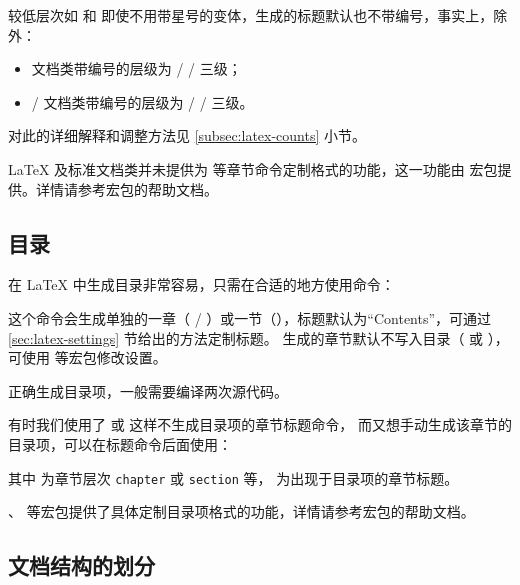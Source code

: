 较低层次如  和  即使不用带星号的变体，生成的标题默认也不带编号，事实上，除  外：
\begin{itemize}
  \item {} 文档类带编号的层级为  /  /  三级；
  \item {} /  文档类带编号的层级为  /  /  三级。
\end{itemize}
对此的详细解释和调整方法见 \ref{subsec:latex-counts} 小节。

\LaTeX{} 及标准文档类并未提供为  等章节命令定制格式的功能，这一功能由  宏包提供。详情请参考宏包的帮助文档。

\subsection{目录}\label{sec:toc}

在 \LaTeX{} 中生成目录非常容易，只需在合适的地方使用命令：
\begin{command}
\end{command}

这个命令会生成单独的一章（ / ）或一节（），标题默认为“Contents”，可通过 \ref{sec:latex-settings} 节给出的方法定制标题。
 生成的章节默认不写入目录（ 或 ），可使用  等宏包修改设置。

正确生成目录项，一般需要编译两次源代码。

有时我们使用了  或  这样不生成目录项的章节标题命令，
而又想手动生成该章节的目录项，可以在标题命令后面使用：
\begin{command}
\end{command}

其中  为章节层次 \texttt{chapter} 或 \texttt{section} 等， 为出现于目录项的章节标题。

、 等宏包提供了具体定制目录项格式的功能，详情请参考宏包的帮助文档。

\subsection{文档结构的划分}\label{sec:matters}

